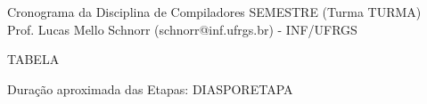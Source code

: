 \documentclass[11pt,portuguese,]{article}
\begin{document}
\begin{center}
  {\LARGE Cronograma da Disciplina de Compiladores SEMESTRE (Turma TURMA)} \\
  Prof. Lucas Mello Schnorr (schnorr@inf.ufrgs.br) - INF/UFRGS
\end{center}

TABELA

\begin{center}
Duração aproximada das Etapas:  DIASPORETAPA
\end{center}
\end{document}
